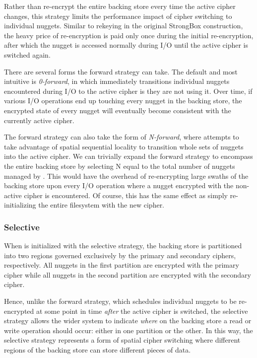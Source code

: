 Rather than re-encrypt the entire backing store every time the active cipher
changes, this strategy limits the performance impact of cipher switching to
individual nuggets. Similar to rekeying in the original StrongBox construction,
the heavy price of re-encryption is paid only once during the initial
re-encryption, after which the nugget is accessed normally during I/O until the
active cipher is switched again.

There are several forms the forward strategy can take. The default and most
intuitive is \emph{0-forward}, in which \SYSTEM{} immediately transitions
individual nuggets encountered during I/O to the active cipher is they are not
using it. Over time, if various I/O operations end up touching every nugget in
the backing store, the encrypted state of every nugget will eventually become
consistent with the currently active cipher.

The forward strategy can also take the form of \emph{N-forward}, where \SYSTEM{}
attempts to take advantage of spatial sequential locality to transition whole
sets of nuggets into the active cipher. We can trivially expand the forward
strategy to encompass the entire backing store by selecting N equal to the total
number of nuggets managed by \SYSTEM{}. This would have the overhead of
re-encrypting large swaths of the backing store upon every I/O operation where a
nugget encrypted with the non-active cipher is encountered. Of course, this has
the same effect as simply re-initializing the entire filesystem with the new
cipher.

\subsubsection{Selective}

When \SYSTEM{} is initialized with the selective strategy, the backing store is
partitioned into two regions governed exclusively by the primary and secondary
ciphers, respectively. All nuggets in the first partition are encrypted with the
primary cipher while all nuggets in the second partition are encrypted with the
secondary cipher.

Hence, unlike the forward strategy, which schedules individual nuggets to be
re-encrypted at some point in time \emph{after} the active cipher is switched,
the selective strategy allows the wider system to indicate \emph{where} on the
backing store a read or write operation should occur: either in one partition or
the other. In this way, the selective strategy represents a form of spatial
cipher switching where different regions of the backing store can store
different pieces of data.

